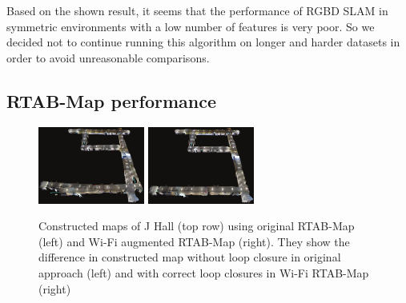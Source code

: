 Based on the shown result, it seems that the performance of RGBD SLAM in symmetric environments with a low number of features is very poor. 
So we decided not to continue running this algorithm on longer and harder datasets in order to avoid unreasonable comparisons.  
\subsection{RTAB-Map performance}

\begin{figure}[h]
    \centering
    \includegraphics[height=1.0in]{Figure9_a.eps}
    \hspace{.2in}
    \includegraphics[height=1.0in]{Figure9_b.eps}
    \hspace{.2in}
\caption{Constructed maps of J Hall (top row) using original RTAB-Map (left) and Wi-Fi augmented RTAB-Map (right). They show the difference in constructed map without loop closure in original approach (left) and with correct loop closures in Wi-Fi RTAB-Map (right)}
\label{fig:rtabmap_maps_2}
\end{figure}
